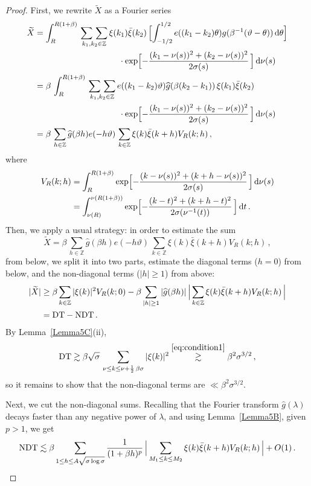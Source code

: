 \documentclass[11pt]{amsart}
\numberwithin{equation}{section}
\newcommand{\bZ}{\mathbb Z}
\begin{document}
\begin{proof}
First, we rewrite $\widetilde X$ as a Fourier series
\begin{align*}
\widetilde{X} &=
\int_R^{R(1+\beta)}\, \underset{k_1, k_2\in\bZ}{\sum\, \sum}\, \xi(k_1)\bar\xi(k_2)\,
\Bigl[
\int_{-1/2}^{1/2} e((k_1-k_2)\theta) g(\beta^{-1}(\vartheta-\theta))\, {\rm d}\theta
\Bigr] \\
& \qquad \qquad \qquad \qquad \qquad
\cdot \exp\Bigl[ -\frac{(k_1-\nu(s))^2 + (k_2-\nu(s))^2}{2\sigma(s)}\, \Bigr]\, {\rm d}\nu(s) \\
&= \beta\, \int_R^{R(1+\beta)}\, \underset{k_1, k_2\in\bZ}{\sum\, \sum}\,
e((k_1-k_2)\vartheta) \widehat{g}(\beta(k_2-k_1))\, \xi(k_1)\bar \xi(k_2) \\
& \qquad \qquad \qquad \qquad \qquad
\cdot \exp\Bigl[ -\frac{(k_1-\nu(s))^2 + (k_2-\nu(s))^2}{2\sigma(s)}\, \Bigr]\, {\rm d}\nu(s) \\
&= \beta\,
\sum_{h\in\bZ} \widehat{g}(\beta h) e(-h\vartheta)\,
\sum_{k\in\bZ} \xi(k)\bar\xi(k+h) V_R(k; h)\,,
\end{align*}
where
\begin{align*}
V_R(k; h) &= \int_R^{R(1+\beta)} \exp\Bigl[ -\frac{(k-\nu(s))^2 + (k+h-\nu(s))^2}{2\sigma(s)}\, \Bigr]\, {\rm d}\nu(s) \\
&=
\int_{\nu(R)}^{\nu(R(1+\beta))} \exp\Bigl[ -\frac{(k-t)^2 + (k+h-t)^2}{2\sigma(\nu^{-1}(t))}\, \Bigr]\, {\rm d}t \,.
\end{align*}
Then, we apply a usual strategy: in order to estimate the sum
\[
\widetilde{X} =
\beta\,
\sum_{h\in\bZ} \widehat{g}(\beta h) e(-h\vartheta)\,
\sum_{k\in\bZ} \xi(k)\bar\xi(k+h) V_R(k; h)\,,
\]
from below, we split it into two parts, estimate the diagonal terms ($h=0$)  from below,
and the non-diagonal terms ($|h|\ge 1$) from above:
\begin{align*}
|\widetilde{X}| &\ge \beta \sum_{k\in\bZ} |\xi(k)|^2 V_R(k; 0)
- \beta \sum_{|h|\ge 1} |\widehat{g}(\beta h)|\,
\Bigl|\,
\sum_{k\in\bZ} \xi(k)\bar\xi(k+h) V_R(k; h)
\,\Bigr| \\
&= {\rm DT} - {\rm NDT}\,.
\end{align*}
By Lemma~\ref{Lemma5C}(ii),
\[
{\rm DT} \gtrsim \beta\sqrt{\sigma}\, \sum_{\nu \le k \le  \nu + \frac12\, \beta\sigma} |\xi(k)|^2
\stackrel{\eqref{eq:condition1}}\gtrsim \beta^2\sigma^{3/2}\,,
\]
so it remains to show that the non-diagonal terms are $\ll \beta^2\sigma^{3/2}$.

Next, we cut the non-diagonal sums. Recalling that the Fourier transform $\widehat{g}(\lambda)$
decays faster than any negative power of $\lambda$, and using Lemma~\ref{Lemma5B}, given $p>1$,
we get
\[
{\rm NDT} \lesssim
\beta \sum_{1\le h \le A\sqrt{\sigma\log\sigma}} \frac1{(1+\beta h)^p}\,
\Bigl|\,
\sum_{M_1\le k \le M_2} \xi(k)\bar\xi(k+h) V_R(k; h)
\,\Bigr| + O(1)\,.
\]


\end{proof}
\end{document}
